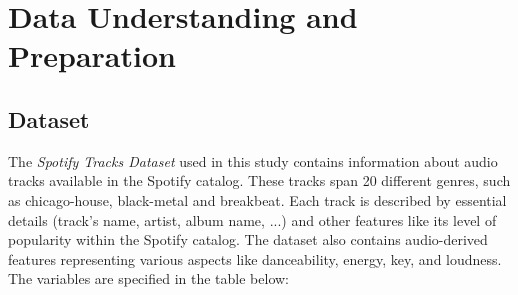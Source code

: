 \chapter*{Data Understanding and Preparation} %
\vspace{-10mm}
\section{Dataset}
The \textit{Spotify Tracks Dataset} used in this study contains information about audio tracks available in the Spotify catalog. These tracks span 20 different genres, such as chicago-house, black-metal and breakbeat. Each track is described by essential details (track's name, artist, album name, ...) and other features like its level of popularity within the Spotify catalog. The dataset also contains audio-derived features representing various aspects like danceability, energy, key, and loudness. The variables are specified in the table below:
